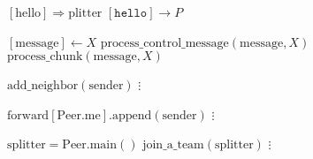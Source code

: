 \documentclass{article}
\begin{document}
\pagestyle{empty}

\newcommand{\send}{\Rightarrow}
\newcommand{\sendto}{\rightarrow}
\algrenewcommand\textproc{\textrm}

\begin{algorithmic}
  \algrenewcommand{}
  
  \State $[\text{hello}] \send \text{plitter}$
  \State $[\mathtt{hello}] \sendto P$
  \EndFor
  \EndFunction

  \State $[\text{message}] \gets X$
  \State $\text{process\_control\_message}(\text{message}, X)$
  \Else
  \State $\text{process\_chunk}(\text{message}, X)$
  \EndIf
  \EndFunction
  
  \State $\text{add\_neighbor}(\text{sender})$
  \EndIf
  \State $\vdots$
  \EndFunction

  \State $\text{forward}[\text{Peer.me}].\text{append}(\text{sender})$
  \State $\vdots$
  \EndFunction

  \State $\text{splitter}=\text{Peer.main}()$
  \State $\text{join\_a\_team}(\text{splitter})$
  \State $\vdots$
  \EndFunction
  
  \EndProcedure
\end{algorithmic}
\end{document}
